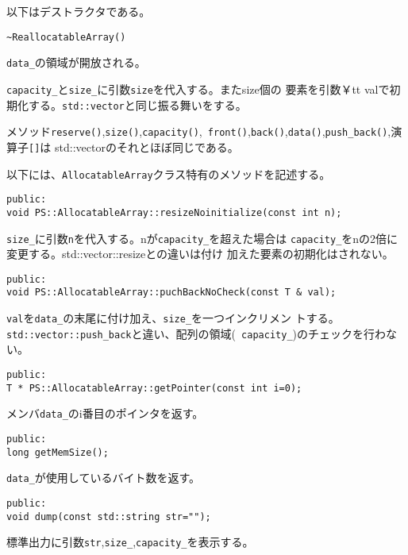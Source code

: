 以下はデストラクタである。

\begin{screen}
\begin{verbatim}
~ReallocatableArray()
\end{verbatim}
\end{screen}

{\tt data\_}の領域が開放される。


{\tt capacity\_}と{\tt size\_}に引数{\tt size}を代入する。またsize個の
要素を引数{￥tt val}で初期化する。{\tt std::vector}と同じ振る舞いをする。

メソッド{\tt reserve()},{\tt size()},{\tt capacity()},{\tt
front()},{\tt back()},{\tt data()},{\tt push\_back()},演算子{\tt []}は
std::vectorのそれとほぼ同じである。

以下には、{\tt AllocatableArray}クラス特有のメソッドを記述する。

\begin{screen}
\begin{verbatim}
public:
void PS::AllocatableArray::resizeNoinitialize(const int n);
\end{verbatim}
\end{screen}

{\tt size\_}に引数{\tt n}を代入する。nが{\tt capacity\_}を超えた場合は
{\tt capacity\_}をnの2倍に変更する。{std::vector::resize}との違いは付け
加えた要素の初期化はされない。


\begin{screen}
\begin{verbatim}
public:
void PS::AllocatableArray::puchBackNoCheck(const T & val);
\end{verbatim}
\end{screen}

{\tt val}を{\tt data\_}の末尾に付け加え、{\tt size\_}を一つインクリメン
トする。{\tt std::vector::push\_back}と違い、配列の領域({\tt
capacity\_})のチェックを行わない。

\begin{screen}
\begin{verbatim}
public:
T * PS::AllocatableArray::getPointer(const int i=0);
\end{verbatim}
\end{screen}
メンバ{\tt data\_}のi番目のポインタを返す。

\begin{screen}
\begin{verbatim}
public:
long getMemSize();
\end{verbatim}
\end{screen}
{\tt data\_}が使用しているバイト数を返す。

\begin{screen}
\begin{verbatim}
public:
void dump(const std::string str="");
\end{verbatim}
\end{screen}

標準出力に引数{\tt str},{\tt size\_},{\tt capacity\_}を表示する。
